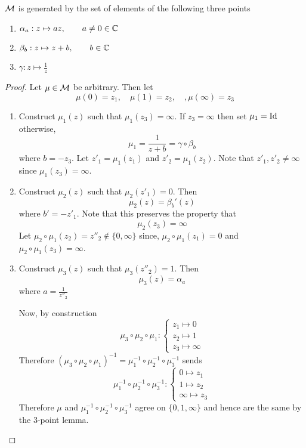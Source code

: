 \documentclass{article}
\begin{document}
\begin{prop}
    $\mathcal{M}$ is generated by the set of elements of the following three points
    \begin{enumerate}
        \item $\alpha_a: z \mapsto az, \qquad a \neq 0 \in \mathbb{C}$
        \item $\beta_b: z \mapsto z + b, \qquad b \in \mathbb{C}$
        \item $\gamma: z \mapsto \frac{1}{z}$
    \end{enumerate}
\end{prop}
\begin{proof}
    Let $\mu \in \mathcal{M}$ be arbitrary. Then let
    \[
        \mu(0) = z_1, \quad \mu(1) = z_2, \quad, \mu(\infty) = z_3  
    \]
    \begin{enumerate}[steps]
        \item Construct $\mu_1(z)$ such that $\mu_1(z_3) = \infty$. If $z_3 = \infty$ then set $\mu_1 = \mathrm{Id}$ otherwise,
        \[
            \mu_1 = \frac{1}{z + b} = \gamma \circ \beta_b
        \]
        where $b = - z_3$. Let $z'_1 = \mu_1(z_1)$ and $z'_2 = \mu_1(z_2)$. Note that $z'_1, z'_2 \neq \infty$ since $\mu_1(z_3) = \infty$.
        \item Construct $\mu_2(z)$ such that $\mu_2(z'_1) = 0$. Then
        \[
            \mu_2(z) = \beta_b'(z)
        \]
        where $b' = - z'_1$. Note that this preserves the property that
        \[
            \mu_2(z_3) = \infty  
        \]
        Let $\mu_2 \circ \mu_1 (z_2) = z''_2 \notin \{0, \infty\}$ since, $\mu_2 \circ \mu_1 (z_1) = 0$ and $\mu_2 \circ \mu_1 (z_3) = \infty$.
        \item Construct $\mu_3(z)$ such that $\mu_3(z''_2) = 1$. Then
        \[
            \mu_3(z) = \alpha_a  
        \]
        where $a = \frac{1}{z''_2}$

        Now, by construction
        \[
            \mu_3 \circ \mu_2 \circ \mu_1: \begin{cases}
                z_1 \mapsto 0 \\
                z_2 \mapsto 1 \\
                z_3 \mapsto \infty
            \end{cases}
        \]
        Therefore $(\mu_3 \circ \mu_2 \circ \mu_1)^{-1} = \mu_1^{-1} \circ \mu_2^{-1} \circ \mu_3^{-1}$ sends
        \[
            \mu_1^{-1} \circ \mu_2^{-1} \circ \mu_3^{-1}: \begin{cases}
                0 \mapsto z_1 \\
                1 \mapsto z_2 \\
                \infty \mapsto z_3
            \end{cases}
        \]
        Therefore $\mu$ and $\mu_1^{-1} \circ \mu_2^{-1} \circ \mu_3^{-1}$ agree on $\{0, 1, \infty\}$ and hence are the same by the 3-point lemma.
    \end{enumerate}
\end{proof}
\end{document}
